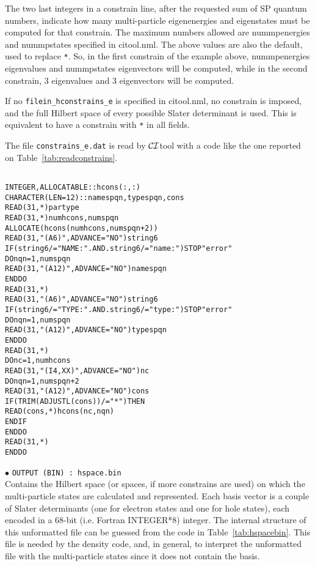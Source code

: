 \documentclass[12pt,twoside]{article}
\newcommand*{\CItool}[0]{{$\cal CI$}\textsf{tool} }
\begin{document}
The two last integers in a constrain line, after the requested sum of
SP quantum numbers, indicate how many multi-particle eigenenergies and
eigenstates must be computed for that constrain. The maximum numbers
allowed are \textsf{nummpenergies} and \textsf{nummpstates} specified
in \textsf{citool.nml}. The above values are also the default, used
to replace \verb#*#. So, in the first constrain of the example above,
\textsf{nummpenergies} eigenvalues and \textsf{nummpstates} eigenvectors
will be computed, while in the second constrain, 3 eigenvalues and
3 eigenvectors will be computed.

If no \verb#filein_hconstrains_e# is specified in \textsf{citool.nml},
no constrain is imposed, and the full Hilbert space of every possible
Slater determinant is used. This is equivalent to have a constrain
with \verb#*# in all fields.

The file \verb#constrains_e.dat# is read by \CItool with a code like
the one reported on Table~\ref{tab:readconstrains}.

\begin{table}
\begin{alltt}
\ \\
INTEGER, ALLOCATABLE :: hcons(:,:)
CHARACTER(LEN=12) :: namespqn, typespqn, cons
READ(31,*) partype
READ(31,*) numhcons, numspqn
ALLOCATE(hcons(numhcons,numspqn+2))
READ(31,"(A6)",ADVANCE="NO") string6
IF (string6/="NAME: " .AND. string6/="name: ") STOP "error"
DO nqn= 1, numspqn
  READ(31,"(A12)",ADVANCE="NO") namespqn
END DO
READ(31,*)
READ(31,"(A6)",ADVANCE="NO") string6
IF (string6/="TYPE: " .AND. string6/="type: ") STOP "error"
DO nqn= 1, numspqn
  READ(31,"(A12)",ADVANCE="NO") typespqn
END DO
READ(31,*)
DO nc= 1, numhcons
  READ(31,"(I4,XX)",ADVANCE="NO") nc
  DO nqn= 1, numspqn + 2
    READ(31,"(A12)",ADVANCE="NO") cons
    IF (TRIM(ADJUSTL(cons)) /= "*") THEN
      READ(cons,*) hcons(nc,nqn)
    END IF        
  END DO
  READ(31,*)
END DO
\end{alltt}
\caption{Scrap of \CItool code for reading the constrains file \textsf{constrains\_e.dat}.}
\label{tab:readconstrains}
\end{table}


$\bullet$ \verb#OUTPUT (BIN) : hspace.bin#
\\
Contains the Hilbert space (or spaces, if more constrains are used) on
which the multi-particle states are calculated and represented.  Each
basis vector is a couple of Slater determinants (one for electron
states and one for hole states), each encoded in a 68-bit
(i.e. Fortran INTEGER*8) integer. The internal structure of this
unformatted file can be guessed from the code in
Table~\ref{tab:hspacebin}. This file is needed by the density code,
and, in general, to interpret the unformatted file with the
multi-particle states since it does not contain the basis.
\end{document}
